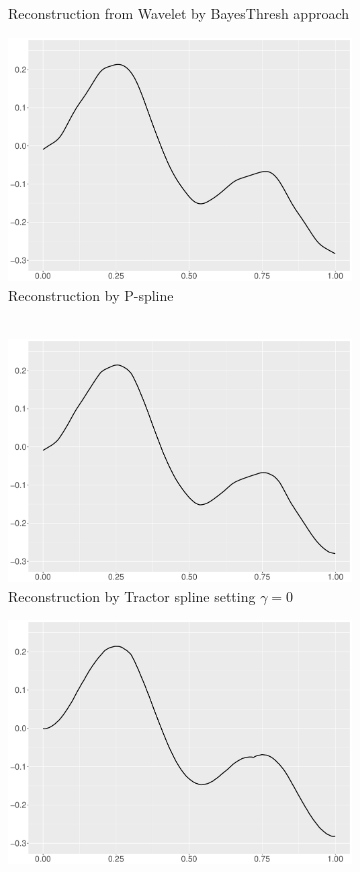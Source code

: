 \begin{figure}
\begin{subfigure}{0.45\textwidth}
    \caption{Reconstruction from Wavelet by BayesThresh approach}
    \end{subfigure}
    \begin{subfigure}{0.45\textwidth}
    \centering
    \includegraphics[width=\linewidth,height=0.45\textwidth]{Chapters/02TractorSplineTheory/plot/ggplot/ggHeaviSinePSpline.pdf}
    \caption{Reconstruction by P-spline \\\mbox{  } }
    \end{subfigure}
    \begin{subfigure}{0.45\textwidth}
    \centering
    \includegraphics[width=\linewidth,height=0.45\textwidth]{Chapters/02TractorSplineTheory/plot/ggplot/ggHeaviSineGamma.pdf}
    \caption{Reconstruction by Tractor spline setting $\gamma=0$}
    \end{subfigure}
  \begin{subfigure}{0.45\textwidth}
    \centering
    \includegraphics[width=\linewidth,height=0.45\textwidth]{Chapters/02TractorSplineTheory/plot/ggplot/ggHeaviSineTractorAPT.pdf}

\end{subfigure}
\end{figure}

